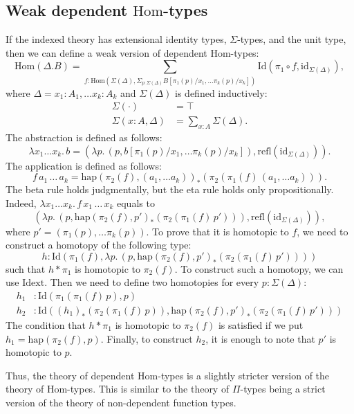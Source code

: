 \documentclass[reqno]{amsart}
\theoremstyle{definition}
\theoremstyle{remark}
\newcommand{\fs}[1]{\mathrm{#1}}
\newcommand{\Hom}{\fs{Hom}}
\newcommand{\Id}{\fs{Id}}
\newcommand{\refl}{\fs{refl}}
\newcommand{\id}{\fs{id}}
\numberwithin{figure}{section}
\begin{document}
\subsection{Weak dependent $\Hom$-types}

If the indexed theory has extensional identity types, $\Sigma$-types, and the unit type, then we can define a weak version of dependent $\Hom$-types:
\[ \Hom(\Delta.B) = \sum_{f : \Hom(\Sigma(\Delta),\Sigma_{p : \Sigma(\Delta)} B[\pi_1(p)/x_1, \ldots \pi_k(p)/x_k])} \Id(\pi_1 \circ f, \id_{\Sigma(\Delta)}), \]
where $\Delta = x_1 : A_1, \ldots x_k : A_k$ and $\Sigma(\Delta)$ is defined inductively:
\begin{align*}
\Sigma(\cdot) & = \top \\
\Sigma(x : A, \Delta) & = \sum_{x : A} \Sigma(\Delta).
\end{align*}
The abstraction is defined as follows:
\[ \lambda x_1 \ldots x_k.\,b = (\lambda p.\,(p, b[\pi_1(p)/x_1, \ldots \pi_k(p)/x_k]), \refl(\id_{\Sigma(\Delta)})). \]
The application is defined as follows:
\[ f\,a_1\,\ldots\,a_k = \fs{hap}(\pi_2(f),(a_1, \ldots a_k))_*(\pi_2(\pi_1(f)\,(a_1, \ldots a_k))). \]
The beta rule holds judgmentally, but the eta rule holds only propositionally.
Indeed, $\lambda x_1 \ldots x_k.\,f\,x_1\,\ldots\,x_k$ equals to
\[ (\lambda p.\,(p,\fs{hap}(\pi_2(f),p')_*(\pi_2(\pi_1(f)\,p'))), \refl(\id_{\Sigma(\Delta)})), \]
where $p' = (\pi_1(p), \ldots \pi_k(p))$.
To prove that it is homotopic to $f$, we need to construct a homotopy of the following type:
\[ h : \Id(\pi_1(f), \lambda p.\,(p,\fs{hap}(\pi_2(f),p')_*(\pi_2(\pi_1(f)\,p')))) \]
such that $h * \pi_1$ is homotopic to $\pi_2(f)$.
To construct such a homotopy, we can use $\fs{Idext}$.
Then we need to define two homotopies for every $p : \Sigma(\Delta)$:
\begin{align*}
h_1 & : \Id(\pi_1(\pi_1(f)\,p),p) \\
h_2 & : \Id((h_1)_*(\pi_2(\pi_1(f)\,p)),\fs{hap}(\pi_2(f),p')_*(\pi_2(\pi_1(f)\,p')))
\end{align*}
The condition that $h * \pi_1$ is homotopic to $\pi_2(f)$ is satisfied if we put $h_1 = \fs{hap}(\pi_2(f),p)$.
Finally, to construct $h_2$, it is enough to note that $p'$ is homotopic to $p$.

Thus, the theory of dependent $\Hom$-types is a slightly stricter version of the theory of $\Hom$-types.
This is similar to the theory of $\Pi$-types being a strict version of the theory of non-dependent function types.
\end{document}
